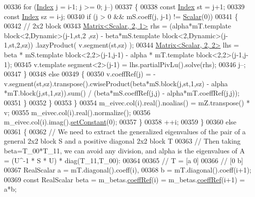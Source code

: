 \begin{DoxyCode}
{00336             \textcolor{keywordflow}{for} (\hyperlink{group___eigenvalues___module_a46a0ff3841059479ec314e56a5645302}{Index} j = i-1; j >= 0; j--)
00337             \{
00338               \textcolor{keyword}{const} \hyperlink{group___eigenvalues___module_a46a0ff3841059479ec314e56a5645302}{Index} st = j+1;
00339               \textcolor{keyword}{const} \hyperlink{group___eigenvalues___module_a46a0ff3841059479ec314e56a5645302}{Index} sz = i-j;
00340               \textcolor{keywordflow}{if} (j > 0 && mS.coeff(j, j-1) != \hyperlink{group___eigenvalues___module_afb318d0b097ff8dd5a7410d31317ca47}{Scalar}(0))
00341               \{
00342                 \textcolor{comment}{// 2x2 block}
00343                 \hyperlink{group___core___module_class_eigen_1_1_matrix}{Matrix<Scalar, 2, 1>} rhs = (alpha*mT.template block<2,Dynamic>(j-1,st,2
      ,sz) - beta*mS.template block<2,Dynamic>(j-1,st,2,sz)) .lazyProduct( v.segment(st,sz) );
00344                 \hyperlink{group___core___module_class_eigen_1_1_matrix}{Matrix<Scalar, 2, 2>} lhs = beta * mS.template block<2,2>(j-1,j-1) - 
      alpha * mT.template block<2,2>(j-1,j-1);
00345                 v.template segment<2>(j-1) = lhs.partialPivLu().solve(rhs);
00346                 j--;
00347               \}
00348               \textcolor{keywordflow}{else}
00349               \{
00350                 v.coeffRef(j) = -v.segment(st,sz).transpose().cwiseProduct(beta*mS.block(j,st,1,sz) - alpha
      *mT.block(j,st,1,sz)).sum() / (beta*mS.coeffRef(j,j) - alpha*mT.coeffRef(j,j));
00351               \}
00352             \}
00353           \}
00354           m\_eivec.col(i).real().noalias() = mZ.transpose() * v;
00355           m\_eivec.col(i).real().normalize();
00356           m\_eivec.col(i).imag().\hyperlink{class_eigen_1_1_plain_object_base_ac8dea1df3d92b752cc683ff42abf6f9b}{setConstant}(0);
00357         \}
00358         ++i;
00359       \}
00360       \textcolor{keywordflow}{else}
00361       \{
00362         \textcolor{comment}{// We need to extract the generalized eigenvalues of the pair of a general 2x2 block S and a
       positive diagonal 2x2 block T}
00363         \textcolor{comment}{// Then taking beta=T\_00*T\_11, we can avoid any division, and alpha is the eigenvalues of A = (U^-1
       * S * U) * diag(T\_11,T\_00):}
00364 
00365         \textcolor{comment}{// T =  [a 0]}
00366         \textcolor{comment}{//      [0 b]}
00367         RealScalar a = mT.diagonal().coeff(i),
00368                    b = mT.diagonal().coeff(i+1);
00369         \textcolor{keyword}{const} RealScalar beta = m\_betas.\hyperlink{class_eigen_1_1_plain_object_base_a25626a55b26a4323565f79d1b7c48ea8}{coeffRef}(i) = m\_betas.\hyperlink{class_eigen_1_1_plain_object_base_a25626a55b26a4323565f79d1b7c48ea8}{coeffRef}(i+1) = a*b;
}
\end{DoxyCode}
